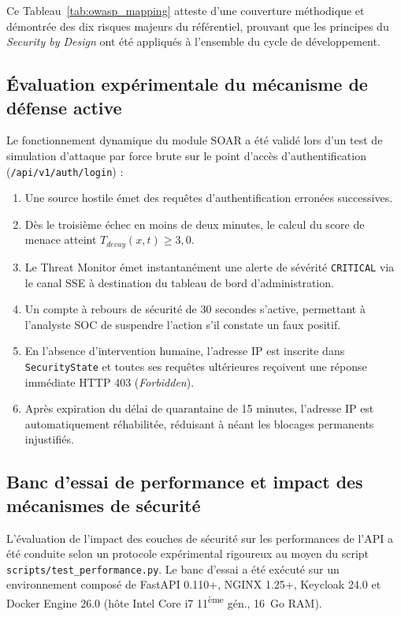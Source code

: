 Ce Tableau~\ref{tab:owasp_mapping} atteste d'une couverture méthodique et démontrée des dix risques majeurs du référentiel, prouvant que les principes du \textit{Security by Design} ont été appliqués à l'ensemble du cycle de développement.

\subsection{Évaluation expérimentale du mécanisme de défense active}
Le fonctionnement dynamique du module SOAR a été validé lors d'un test de simulation d'attaque par force brute sur le point d'accès d'authentification (\texttt{/api/v1/auth/login}) :
\begin{enumerate}[leftmargin=*]
    \item Une source hostile émet des requêtes d'authentification erronées successives.
    \item Dès le troisième échec en moins de deux minutes, le calcul du score de menace atteint $T_{decay}(x, t) \ge 3{,}0$.
    \item Le Threat Monitor émet instantanément une alerte de sévérité \texttt{CRITICAL} via le canal SSE à destination du tableau de bord d'administration.
    \item Un compte à rebours de sécurité de 30 secondes s'active, permettant à l'analyste SOC de suspendre l'action s'il constate un faux positif.
    \item En l'absence d'intervention humaine, l'adresse IP est inscrite dans \texttt{SecurityState} et toutes ses requêtes ultérieures reçoivent une réponse immédiate HTTP 403 (\textit{Forbidden}).
    \item Après expiration du délai de quarantaine de 15 minutes, l'adresse IP est automatiquement réhabilitée, réduisant à néant les blocages permanents injustifiés.
\end{enumerate}

\subsection{Banc d'essai de performance et impact des mécanismes de sécurité}
L'évaluation de l'impact des couches de sécurité sur les performances de l'API a été conduite selon un protocole expérimental rigoureux au moyen du script \texttt{scripts/test\_performance.py}. Le banc d'essai a été exécuté sur un environnement composé de FastAPI 0.110+, NGINX 1.25+, Keycloak 24.0 et Docker Engine 26.0 (hôte Intel Core i7 11\textsuperscript{ème} gén., 16~Go RAM).

